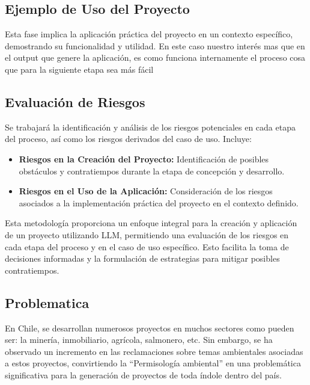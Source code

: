 \subsection{Ejemplo de Uso del Proyecto}

Esta fase implica la aplicación práctica del proyecto en un contexto específico, demostrando su funcionalidad y utilidad. 
En este caso nuestro interés mas que en el output que genere la aplicación, es como funciona internamente el proceso cosa 
que para la siguiente etapa sea más fácil 

\subsection{Evaluación de Riesgos}

Se trabajará la identificación y análisis de los riesgos potenciales en cada etapa del proceso, así como los riesgos derivados
del caso de uso. Incluye:

\begin{itemize}
    \item \textbf{Riesgos en la Creación del Proyecto:} Identificación de posibles obstáculos y contratiempos durante la etapa de concepción y desarrollo.
    \item \textbf{Riesgos en el Uso de la Aplicación:} Consideración de los riesgos asociados a la implementación práctica del proyecto en el contexto definido.
\end{itemize}

Esta metodología proporciona un enfoque integral para la creación y aplicación de un proyecto utilizando LLM, permitiendo una evaluación de los riesgos en cada etapa del proceso y en el caso de uso específico. Esto facilita la toma de decisiones informadas y la formulación de estrategias para mitigar posibles contratiempos.

\subsection{Problematica}

\par En Chile, se desarrollan numerosos proyectos en muchos sectores como pueden ser: la minería, inmobiliario, agrícola, salmonero, etc. Sin embargo, se ha observado un incremento en las reclamaciones 
sobre temas ambientales asociadas a estos proyectos, convirtiendo la ``Permisología ambiental'' en una problemática significativa para la generación de proyectos de toda índole dentro del país.

